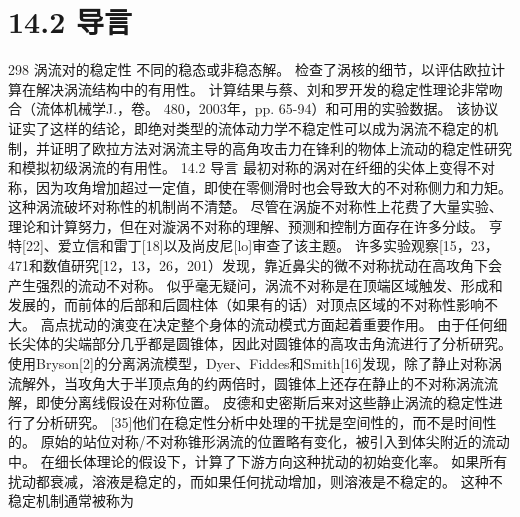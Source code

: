 \documentclass[UTF8,11pt,a4paper,openany,fontset=fandol]{ctexbook}
\begin{document}
\section{14.2 导言}
298 涡流对的稳定性 不同的稳态或非稳态解。 检查了涡核的细节，以评估欧拉计算在解决涡流结构中的有用性。 计算结果与蔡、刘和罗开发的稳定性理论非常吻合（流体机械学J.，卷。 480，2003年，pp. 65-94）和可用的实验数据。 该协议证实了这样的结论，即绝对类型的流体动力学不稳定性可以成为涡流不稳定的机制，并证明了欧拉方法对涡流主导的高角攻击力在锋利的物体上流动的稳定性研究和模拟初级涡流的有用性。 14.2 导言 最初对称的涡对在纤细的尖体上变得不对称，因为攻角增加超过一定值，即使在零侧滑时也会导致大的不对称侧力和力矩。 这种涡流破坏对称性的机制尚不清楚。 尽管在涡旋不对称性上花费了大量实验、理论和计算努力，但在对漩涡不对称的理解、预测和控制方面存在许多分歧。 亨特[22]、爱立信和雷丁[18]以及尚皮尼[lo]审查了该主题。 许多实验观察[15，23，471和数值研究[12，13，26，201）发现，靠近鼻尖的微不对称扰动在高攻角下会产生强烈的流动不对称。 似乎毫无疑问，涡流不对称是在顶端区域触发、形成和发展的，而前体的后部和后圆柱体（如果有的话）对顶点区域的不对称性影响不大。 高点扰动的演变在决定整个身体的流动模式方面起着重要作用。 由于任何细长尖体的尖端部分几乎都是圆锥体，因此对圆锥体的高攻击角流进行了分析研究。 使用Bryson[2]的分离涡流模型，Dyer、Fiddes和Smith[16]发现，除了静止对称涡流解外，当攻角大于半顶点角的约两倍时，圆锥体上还存在静止的不对称涡流流解，即使分离线假设在对称位置。 皮德和史密斯后来对这些静止涡流的稳定性进行了分析研究。 [35]他们在稳定性分析中处理的干扰是空间性的，而不是时间性的。 原始的站位对称/不对称锥形涡流的位置略有变化，被引入到体尖附近的流动中。 在细长体理论的假设下，计算了下游方向这种扰动的初始变化率。 如果所有扰动都衰减，溶液是稳定的，而如果任何扰动增加，则溶液是不稳定的。 这种不稳定机制通常被称为
\end{document}
